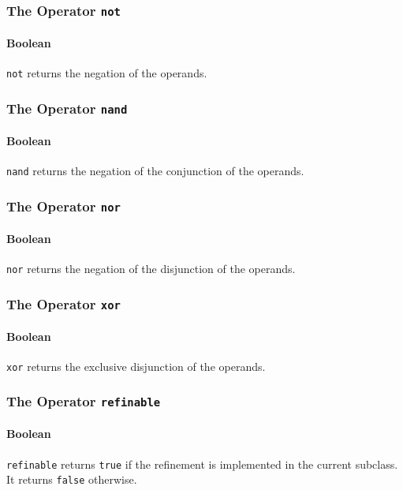 \subsubsection{The Operator {\tt not}}
\paragraph{Boolean}
\verb!not! returns the negation of the operands.

\subsubsection{The Operator {\tt nand}}
\paragraph{Boolean}
\verb!nand! returns the negation of the conjunction of the operands.

\subsubsection{The Operator {\tt nor}}
\paragraph{Boolean}
\verb!nor! returns the negation of the disjunction of the operands.

\subsubsection{The Operator {\tt xor}}
\paragraph{Boolean}
\verb!xor! returns the exclusive disjunction of the operands.

\subsubsection{The Operator {\tt refinable}}
\paragraph{Boolean}
\verb!refinable! returns \verb!true! if the refinement is implemented in the current subclass. It returns \verb!false! otherwise.